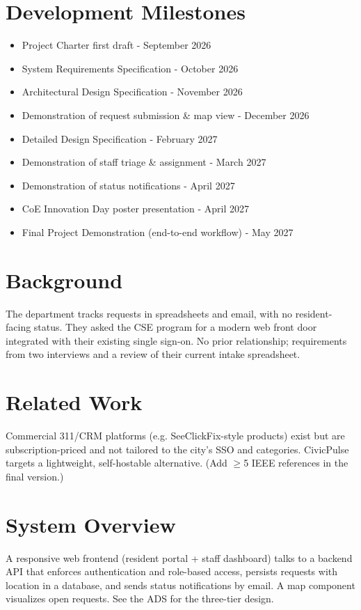 \documentclass[11pt,letterpaper]{article}
\begin{document}
\section{Development Milestones}
\begin{itemize}
  \item Project Charter first draft - September 2026
  \item System Requirements Specification - October 2026
  \item Architectural Design Specification - November 2026
  \item Demonstration of request submission \& map view - December 2026
  \item Detailed Design Specification - February 2027
  \item Demonstration of staff triage \& assignment - March 2027
  \item Demonstration of status notifications - April 2027
  \item CoE Innovation Day poster presentation - April 2027
  \item Final Project Demonstration (end-to-end workflow) - May 2027
\end{itemize}
\newpage

\section{Background}
The department tracks requests in spreadsheets and email, with no resident-facing
status. They asked the CSE program for a modern web front door integrated with their
existing single sign-on. No prior relationship; requirements from two interviews and
a review of their current intake spreadsheet.

\section{Related Work}
Commercial 311/CRM platforms (e.g. SeeClickFix-style products) exist \cite{Rubin2012}
but are subscription-priced and not tailored to the city's SSO and categories.
CivicPulse targets a lightweight, self-hostable alternative. (Add $\geq$5 IEEE
references in the final version.)

\section{System Overview}
A responsive web frontend (resident portal + staff dashboard) talks to a backend API
that enforces authentication and role-based access, persists requests with location
in a database, and sends status notifications by email. A map component visualizes
open requests. See the ADS for the three-tier design.
\end{document}
